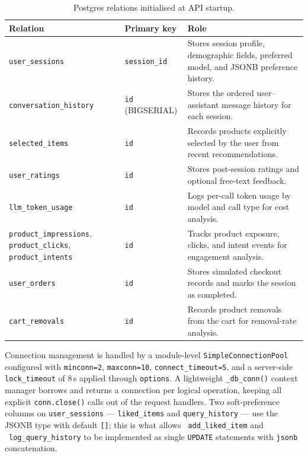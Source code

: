 \begin{table}[H] \centering \caption{Postgres relations initialised at API startup.} 
  \label{tab:impl_pg_tables} \small \begin{tabular}{p{4.4cm} p{3.0cm} p{6.6cm}} \toprule 
  \textbf{Relation} & \textbf{Primary key} & \textbf{Role} \\ \midrule \texttt{user\_sessions} & 
  \texttt{session\_id} & Stores session profile, demographic fields, preferred model, and JSONB 
  preference history. \\ \texttt{conversation\_history} & \texttt{id} (BIGSERIAL) & Stores the ordered 
  user--assistant message history for each session. \\ \texttt{selected\_items} & \texttt{id} & Records 
  products explicitly selected by the user from recent recommendations. \\ \texttt{user\_ratings} & 
  \texttt{id} & Stores post-session ratings and optional free-text feedback. \\ 
  \texttt{llm\_token\_usage} & \texttt{id} & Logs per-call token usage by model and call type for cost 
  analysis. \\ \texttt{product\_impressions}, \texttt{product\_clicks}, \texttt{product\_intents} & 
  \texttt{id} & Tracks product exposure, clicks, and intent events for engagement analysis. \\ 
  \texttt{user\_orders} & \texttt{id} & Stores simulated checkout records and marks the session as 
  completed. \\ \texttt{cart\_removals} & \texttt{id} & Records product removals from the cart for 
  removal-rate analysis. \\ \bottomrule \end{tabular} \end{table}

Connection management is handled by a module-level \texttt{SimpleConnectionPool} configured with \texttt{minconn=2}, \texttt{maxconn=10}, \texttt{connect\_timeout=5}, and a server-side \texttt{lock\_timeout} of 8\,s applied through \texttt{options}. A lightweight \texttt{\_db\_conn()} context manager borrows and returns a connection per logical operation, keeping all explicit \texttt{conn.close()} calls out of the request handlers. Two soft-preference columns on \texttt{user\_sessions} --- \texttt{liked\_items} and \texttt{query\_history} --- use the JSONB type with default \texttt{[]}; this is what allows ~\texttt{add\_liked\_item} and ~\texttt{log\_query\_history} to be implemented as single \texttt{UPDATE} statements with \texttt{jsonb} concatenation.

